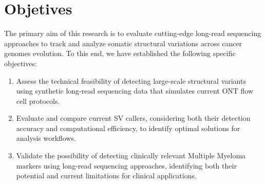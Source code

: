 \chapter{Objetives}

The primary aim of this research is to evaluate cutting-edge long-read 
sequencing approaches to track and analyze somatic structural variations across 
cancer genomes evolution. To this end, we have established the following 
specific objectives:

\begin{enumerate}

    \item Assess the technical feasibility of detecting large-scale structural 
    variants using synthetic long-read sequencing data that simulates current 
    ONT flow cell protocols.
    
    \item Evaluate and compare current SV callers, considering both their 
    detection accuracy and computational efficiency, to identify 
    optimal solutions for analysis workflows.
    
    \item Validate the possibility of detecting clinically relevant Multiple 
    Myeloma markers using long-read sequencing approaches, identifying both 
    their potential and current limitations for clinical applications.
    
\end{enumerate}